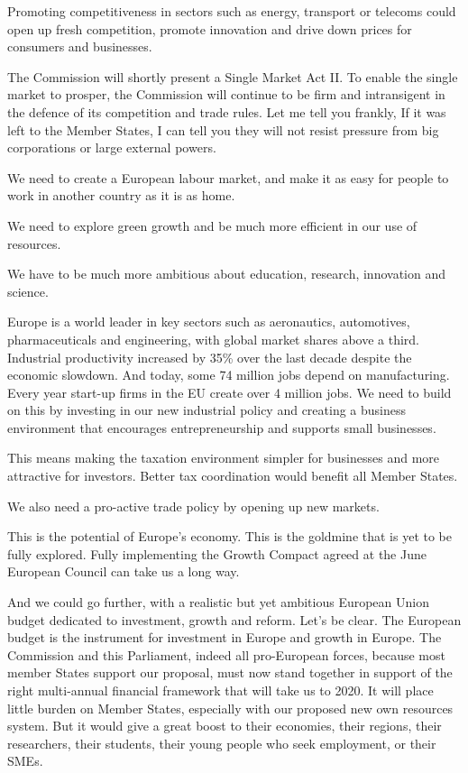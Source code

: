 \documentclass[a4paper,11pt]{article}
\begin{document}
Promoting competitiveness in sectors such as energy, transport or telecoms could open up fresh competition, promote innovation and drive down prices for consumers and businesses.

The Commission will shortly present a Single Market Act II. To enable the single market to prosper, the Commission will continue to be firm and intransigent in the defence of its competition and trade rules. Let me tell you frankly, If it was left to the Member States, I can tell you they will not resist pressure from big corporations or large external powers.

We need to create a European labour market, and make it as easy for people to work in another country as it is as home.

We need to explore green growth and be much more efficient in our use of resources.

We have to be much more ambitious about education, research, innovation and science.

Europe is a world leader in key sectors such as aeronautics, automotives, pharmaceuticals and engineering, with global market shares above a third. Industrial productivity increased by 35\% over the last decade despite the economic slowdown. And today, some 74 million jobs depend on manufacturing. Every year start-up firms in the EU create over 4 million jobs. We need to build on this by investing in our new industrial policy and creating a business environment that encourages entrepreneurship and supports small businesses.

This means making the taxation environment simpler for businesses and more attractive for investors. Better tax coordination would benefit all Member States.

We also need a pro-active trade policy by opening up new markets.

This is the potential of Europe's economy. This is the goldmine that is yet to be fully explored. Fully implementing the Growth Compact agreed at the June European Council can take us a long way.

And we could go further, with a realistic but yet ambitious European Union budget dedicated to investment, growth and reform. Let's be clear. The European budget is the instrument for investment in Europe and growth in Europe. The Commission and this Parliament, indeed all pro-European forces, because most member States support our proposal, must now stand together in support of the right multi-annual financial framework that will take us to 2020. It will place little burden on Member States, especially with our proposed new own resources system. But it would give a great boost to their economies, their regions, their researchers, their students, their young people who seek employment, or their SMEs.
\end{document}
